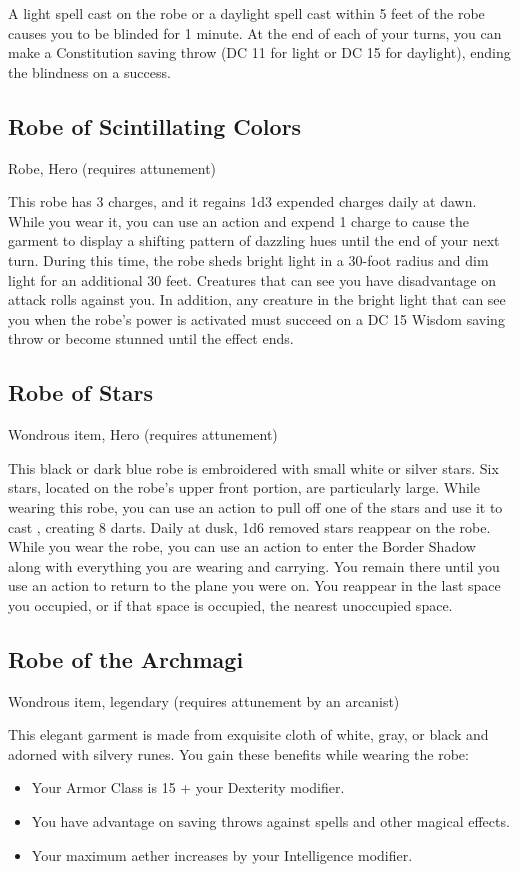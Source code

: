 A light spell cast on the robe or a daylight spell cast within 5 feet of the robe causes you to be blinded for 1 minute. At the end of each of your turns, you can make a Constitution saving throw (DC 11 for light or DC 15 for daylight), ending the blindness on a success.

\subsection{Robe of Scintillating Colors}
Robe, Hero (requires attunement)

This robe has 3 charges, and it regains 1d3 expended charges daily at dawn. While you wear it, you can use an action and expend 1 charge to cause the garment to display a shifting pattern of dazzling hues until the end of your next turn. During this time, the robe sheds bright light in a 30-foot radius and dim light for an additional 30 feet. Creatures that can see you have disadvantage on attack rolls against you. In addition, any creature in the bright light that can see you when the robe's power is activated must succeed on a DC 15 Wisdom saving throw or become stunned until the effect ends.

\subsection{Robe of Stars}
Wondrous item, Hero (requires attunement) 

This black or dark blue robe is embroidered with small white or silver stars. Six stars, located on the robe's upper front portion, are particularly large. While wearing this robe, you can use an action to pull off one of the stars and use it to cast , creating 8 darts. Daily at dusk, 1d6 removed stars reappear on the robe.  While you wear the robe, you can use an action to enter the Border Shadow along with everything you are wearing and carrying. You remain there until you use an action to return to the plane you were on. You reappear in the last space you occupied, or if that space is occupied, the nearest unoccupied space.

\subsection{Robe of the Archmagi}
Wondrous item, legendary (requires attunement by an arcanist) 

This elegant garment is made from exquisite cloth of white, gray, or black and adorned with silvery runes. You gain these benefits while wearing the robe:
\begin{itemize}
    \item Your Armor Class is 15 + your Dexterity modifier.
    \item You have advantage on saving throws against spells and other magical effects.
    \item Your maximum aether increases by your Intelligence modifier.
\end{itemize}

